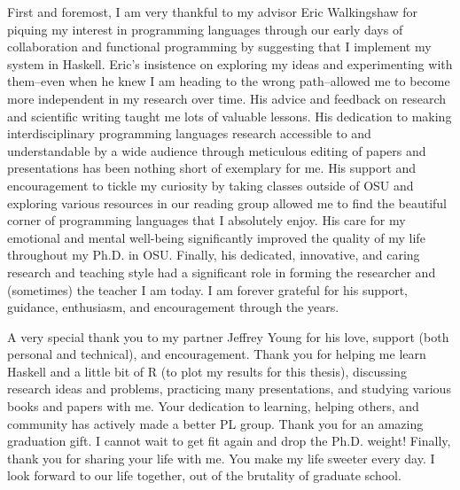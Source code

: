First and foremost, I am very thankful to my advisor Eric Walkingshaw for 
piquing my interest in programming languages through our early days of collaboration
and functional programming by suggesting that I implement my system in Haskell.
%
Eric's insistence on exploring my ideas  and
experimenting with them--even when he knew I am heading 
to the wrong path--allowed me to become more independent in my research over time. 
%
His advice and feedback on research and scientific writing taught me lots of 
valuable lessons. His dedication 
to making interdisciplinary programming languages research accessible
to and understandable by a wide audience through meticulous editing of papers
and presentations has been nothing short of exemplary for me.
%
His support and encouragement to tickle my curiosity by taking classes outside of
OSU and exploring various resources in our reading group allowed me to find the beautiful corner
of programming languages that I absolutely enjoy.
%
His care for my emotional and mental well-being significantly improved the quality 
of my life throughout my Ph.D. in OSU. 
%
Finally, his dedicated, innovative, and caring research and teaching style 
had a significant role in forming the researcher and (sometimes) the teacher I am today. 
%
I am forever grateful for his support, guidance, enthusiasm, and encouragement through 
the years.

%
A very special thank you to my partner Jeffrey Young for his love, support (both personal 
and technical), and encouragement. 
%
Thank you for helping me learn Haskell and a little bit of R (to plot my results for this thesis), 
discussing research ideas and problems,
practicing many presentations, and studying various books and papers with me. 
Your dedication to learning, helping others, and community has actively made a better PL group.
Thank you for an amazing graduation gift. I cannot wait to get fit again and drop the Ph.D. weight! 
Finally, thank you for sharing your life with me. You make my life sweeter every day.
I look forward to our life together, out of the brutality of graduate school. 


